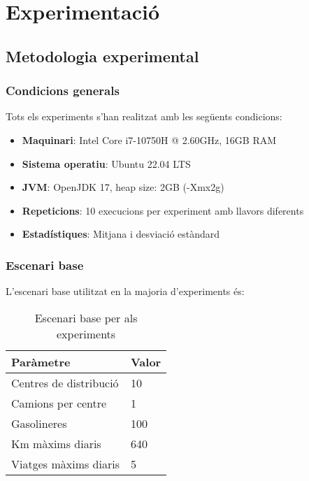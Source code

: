 \section{Experimentació}
\label{sec:experiments}

\subsection{Metodologia experimental}

\subsubsection{Condicions generals}

Tots els experiments s'han realitzat amb les següents condicions:

\begin{itemize}
    \item \textbf{Maquinari}: Intel Core i7-10750H @ 2.60GHz, 16GB RAM
    \item \textbf{Sistema operatiu}: Ubuntu 22.04 LTS
    \item \textbf{JVM}: OpenJDK 17, heap size: 2GB (-Xmx2g)
    \item \textbf{Repeticions}: 10 execucions per experiment amb llavors diferents
    \item \textbf{Estadístiques}: Mitjana i desviació estàndard
\end{itemize}

\subsubsection{Escenari base}

L'escenari base utilitzat en la majoria d'experiments és:

\begin{table}[H]
\centering
\begin{tabular}{@{}ll@{}}
\toprule
\textbf{Paràmetre} & \textbf{Valor} \\
\midrule
Centres de distribució & 10 \\
Camions per centre & 1 \\
Gasolineres & 100 \\
Km màxims diaris & 640 \\
Viatges màxims diaris & 5 \\
\bottomrule
\end{tabular}
\caption{Escenari base per als experiments}
\label{tab:escenari-base}
\end{table}








